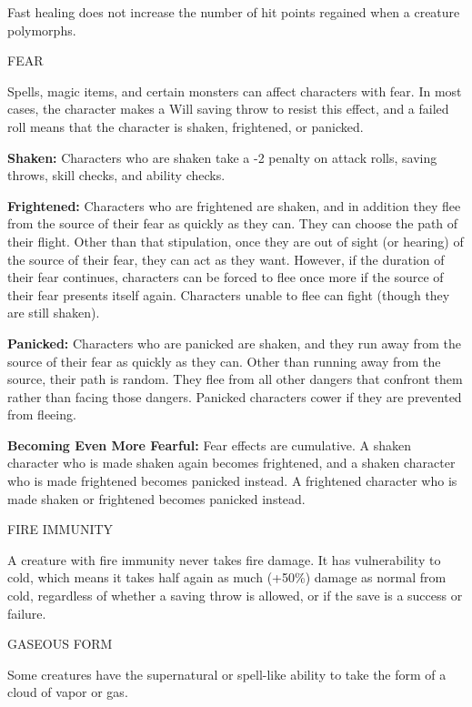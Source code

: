 \documentclass{article}
\begin{document}
Fast healing does not increase the number of hit points regained when a creature 
polymorphs.

\vspace{12pt}
FEAR

Spells, magic items, and certain monsters can affect characters with fear. In most 
cases, the character makes a Will saving throw to resist this effect, and a failed 
roll means that the character is shaken, frightened, or panicked.

\textbf{Shaken: }Characters who are shaken take a -2 penalty on attack rolls, saving 
throws, skill checks, and ability checks.

\textbf{Frightened:} Characters who are frightened are shaken, and in addition 
they flee from the source of their fear as quickly as they can. They can choose 
the path of their flight. Other than that stipulation, once they are out of sight 
(or hearing) of the source of their fear, they can act as they want. However, if 
the duration of their fear continues, characters can be forced to flee once more 
if the source of their fear presents itself again. Characters unable to flee can 
fight (though they are still shaken).

\textbf{Panicked: }Characters who are panicked are shaken, and they run away from 
the source of their fear as quickly as they can. Other than running away from the 
source, their path is random. They flee from all other dangers that confront them 
rather than facing those dangers. Panicked characters cower if they are prevented 
from fleeing.

\textbf{Becoming Even More Fearful:} Fear effects are cumulative. A shaken character 
who is made shaken again becomes frightened, and a shaken character who is made 
frightened becomes panicked instead. A frightened character who is made shaken 
or frightened becomes panicked instead.

\vspace{12pt}
FIRE IMMUNITY

A creature with fire immunity never takes fire damage. It has vulnerability to 
cold, which means it takes half again as much (+50\%) damage as normal from cold, 
regardless of whether a saving throw is allowed, or if the save is a success or 
failure.

\vspace{12pt}
GASEOUS FORM

Some creatures have the supernatural or spell-like ability to take the form of 
a cloud of vapor or gas.
\end{document}
